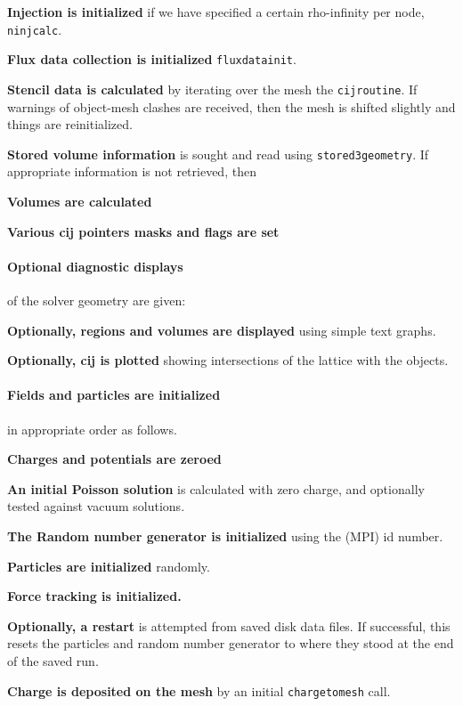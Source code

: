 \documentclass[12pt]{article}
\def\sentence#1{\par\noindent\textbf{#1}}
\begin{document}
\sentence{Injection is initialized} if we have specified a certain
rho-infinity per node, \verb!ninjcalc!.

\sentence{Flux data collection is initialized} \verb!fluxdatainit!.

\sentence{Stencil data is calculated} by iterating over the mesh the
\verb!cijroutine!. If warnings of object-mesh clashes are received,
then the mesh is shifted slightly and things are reinitialized.

\sentence{Stored volume information} is sought and read using
\verb!stored3geometry!. If appropriate information is not retrieved, then

\sentence{Volumes are calculated}

\sentence{Various cij pointers masks and flags are set}

\paragraph{Optional diagnostic displays} of the solver geometry are given:

\sentence{Optionally, regions and volumes are displayed} using simple text
graphs. 

\sentence{Optionally, cij is plotted} showing intersections of the
lattice with the objects.

\paragraph{Fields and particles are initialized} in appropriate order
as follows.

\sentence{Charges and potentials are zeroed}

\sentence{An initial Poisson solution} is calculated with zero
charge, and optionally tested against vacuum solutions.

\sentence{The Random number generator is initialized} using the (MPI) id
number. 

\sentence{Particles are initialized} randomly.

\sentence{Force tracking is initialized.}

\sentence{Optionally, a restart} is attempted from saved disk data
files. If successful, this resets the particles and random number
generator to where they stood at the end of the saved run.

\sentence{Charge is deposited on the mesh} by an initial \verb!chargetomesh! call.
\end{document}
